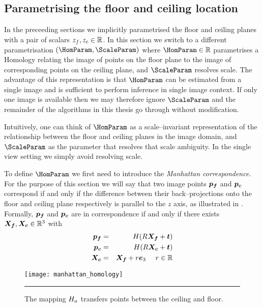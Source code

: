 \subsection{Parametrising the floor and ceiling location}

In the preceeding sections we implicitly parametrised the floor and
ceiling planes with a pair of scalars $\zfloor,\zceil\in\Reals$. In
this section we switch to a different parametrisation
$(\HomParam,\ScaleParam)$ where $\HomParam\in\Reals$ parametrises a
Homology relating the image of points on the floor plane to the image
of corresponding points on the ceiling plane, and $\ScaleParam$
resolves scale. The advantage of this representation is that
$\HomParam$ can be estimated from a single image and is sufficient to
perform inference in single image context. If only one image is
available then we may therefore ignore $\ScaleParam$ and the remainder
of the algorithms in this thesis go through without modification.

Intuitively, one can think of $\HomParam$ as a scale--invariant
representation of the relationship between the floor and ceiling
planes in the image domain, and $\ScaleParam$ as the parameter that
resolves that scale ambiguity. In the single view setting we simply
avoid resolving scale.

To define $\HomParam$ we first need to introduce the \textit{Manhattan
  correspondence}. For the purpose of this section we will say that
two image points $\FloorPt$ and $\CeilPt$ correspond if and only if
the difference between their back--projections onto the floor and
ceiling plane respectively is parallel to the $z$ axis, as illustrated
in . Formally, $\FloorPt$ and $\CeilPt$ are in
correspondence if and only if there exists $\FloorVec,\CeilVec \in
\Rthree$ with
\begin{eqnarray}
  \FloorPt &=& \CamMatrix (\CamR \FloorVec + \CamTr) \\
  \CeilPt &=& \CamMatrix (\CamR \CeilVec + \CamTr) \\
  \CeilVec &=& \FloorVec + r \ez ~~~~ r \in \Reals
\end{eqnarray}

\begin{figure}[tb]
  \label{fig:homology}
  \centering
  \texttt{[image: manhattan\_homology]}
  \caption{The mapping $\Hcf$ transfers points between the ceiling
    and floor.}
  \hrule
\end{figure}

